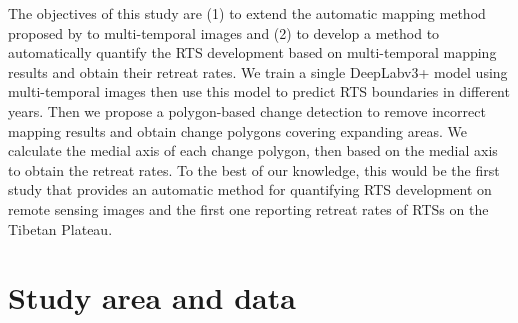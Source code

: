 \documentclass[authoryear,preprint,review,12pt]{elsarticle}
\begin{document}

The objectives of this study are (1) to extend the automatic mapping method proposed by \cite{huang2020using} to multi-temporal images and (2) to develop a method to automatically quantify the RTS development based on multi-temporal mapping results and obtain their retreat rates. 
We train a single DeepLabv3+ model using multi-temporal images then use this model to predict RTS boundaries in different years.
Then we propose a polygon-based change detection to remove incorrect mapping results and obtain change polygons covering expanding areas.  
We calculate the medial axis of each change polygon, then based on the medial axis to obtain the retreat rates.  
To the best of our knowledge, this would be the first study that provides an automatic method for quantifying RTS development on remote sensing images and the first one reporting retreat rates of RTSs on the Tibetan Plateau. 




\section{Study area and data}
\label{sec_studyarea_data}
\end{document}
